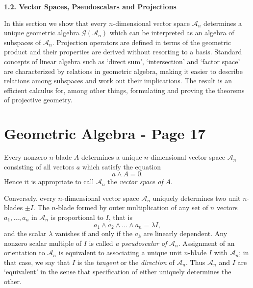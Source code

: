 \documentclass[fleqn]{scrartcl}
\numberwithin{equation}{section}
\begin{document}
\vspace{1.5em}
\noindent\textbf{1.2. Vector Spaces, Pseudoscalars and Projections}

\vspace{1em}
\noindent In this section we show that every \(n\)-dimensional vector space \(\mathscr{A}_n\) determines a unique geometric algebra \(\mathscr{G}(\mathscr{A}_n)\) which can be interpreted as an algebra of subspaces of \(\mathscr{A}_n\). Projection operators are defined in terms of the geometric product and their properties are derived without resorting to a basis. Standard concepts of linear algebra such as `direct sum', `intersection' and `factor space' are characterized by relations in geometric algebra, making it easier to describe relations among subspaces and work out their implications. The result is an efficient calculus for, among other things, formulating and proving the theorems of projective geometry.

\section*{Geometric Algebra - Page 17}

\noindent Every nonzero \(n\)-blade \(A\) determines a unique \(n\)-dimensional vector space \(\mathscr{A}_n\) consisting of all vectors \(a\) which satisfy the equation
\begin{equation}
a \wedge A = 0. \tag{2.1}
\end{equation}
Hence it is appropriate to call \(\mathscr{A}_n\) the \textit{vector space of} \(A\).

\vspace{1em}
\noindent Conversely, every \(n\)-dimensional vector space \(\mathscr{A}_n\) uniquely determines two unit \(n\)-blades \(\pm I\). The \(n\)-blade formed by outer multiplication of any set of \(n\) vectors \(a_1, \dots, a_n\) in \(\mathscr{A}_n\) is proportional to \(I\), that is
\begin{equation}
a_1 \wedge a_2 \wedge \dots \wedge a_n = \lambda I, \tag{2.2}
\end{equation}
and the scalar \(\lambda\) vanishes if and only if the \(a_k\) are linearly dependent. Any nonzero scalar multiple of \(I\) is called \textit{a pseudoscalar of} \(\mathscr{A}_n\). Assignment of an orientation to \(\mathscr{A}_n\) is equivalent to associating a unique unit \(n\)-blade \(I\) with \(\mathscr{A}_n\); in that case, we say that \(I\) is the \textit{tangent} or the \textit{direction} of \(\mathscr{A}_n\). Thus \(\mathscr{A}_n\) and \(I\) are `equivalent' in the sense that specification of either uniquely determines the other.
\end{document}
